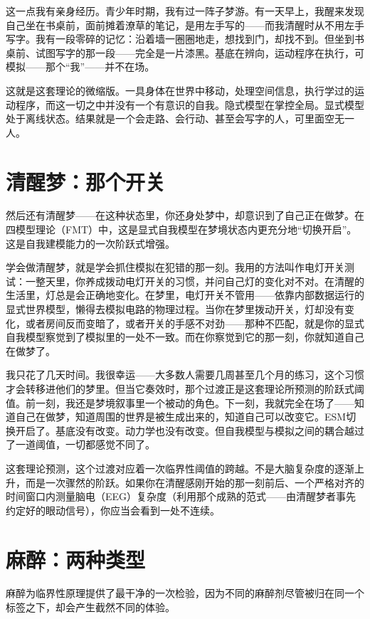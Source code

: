 \documentclass[11pt, twoside, openright]{book}
\begin{document}
这一点我有亲身经历。青少年时期，我有过一阵子梦游。有一天早上，我醒来发现自己坐在书桌前，面前摊着潦草的笔记，是用左手写的------而我清醒时从不用左手写字。我有一段零碎的记忆：沿着墙一圈圈地走，想找到门，却找不到。但坐到书桌前、试图写字的那一段------完全是一片漆黑。基底在辨向，运动程序在执行，可模拟------那个“我”------并不在场。

这就是这套理论的微缩版。一具身体在世界中移动，处理空间信息，执行学过的运动程序，而这一切之中并没有一个有意识的自我。隐式模型在掌控全局。显式模型处于离线状态。结果就是一个会走路、会行动、甚至会写字的人，可里面空无一人。

\section*{清醒梦：那个开关}

然后还有清醒梦------在这种状态里，你还身处梦中，却意识到了自己正在做梦。在四模型理论（FMT）中，这是显式自我模型在梦境状态内更充分地“切换开启”。这是自我建模能力的一次阶跃式增强。

学会做清醒梦，就是学会抓住模拟在犯错的那一刻。我用的方法叫作电灯开关测试：一整天里，你养成拨动电灯开关的习惯，并问自己灯的变化对不对。在清醒的生活里，灯总是会正确地变化。在梦里，电灯开关不管用------依靠内部数据运行的显式世界模型，懒得去模拟电路的物理过程。当你在梦里拨动开关，灯却没有变化，或者房间反而变暗了，或者开关的手感不对劲------那种不匹配，就是你的显式自我模型察觉到了模拟里的一处不一致。而在你察觉到它的那一刻，你就知道自己在做梦了。

我只花了几天时间。我很幸运------大多数人需要几周甚至几个月的练习，这个习惯才会转移进他们的梦里。但当它奏效时，那个过渡正是这套理论所预测的阶跃式阈值。前一刻，我还是梦境叙事里一个被动的角色。下一刻，我就完全在场了------知道自己在做梦，知道周围的世界是被生成出来的，知道自己可以改变它。ESM切换开启了。基底没有改变。动力学也没有改变。但自我模型与模拟之间的耦合越过了一道阈值，一切都感觉不同了。

这套理论预测，这个过渡对应着一次临界性阈值的跨越。不是大脑复杂度的逐渐上升，而是一次骤然的阶跃。如果你在清醒感刚开始的那一刻前后、一个严格对齐的时间窗口内测量脑电（EEG）复杂度（利用那个成熟的范式------由清醒梦者事先约定好的眼动信号），你应当会看到一处不连续。

\section*{麻醉：两种类型}

麻醉为临界性原理提供了最干净的一次检验，因为不同的麻醉剂尽管被归在同一个标签之下，却会产生截然不同的体验。
\end{document}
